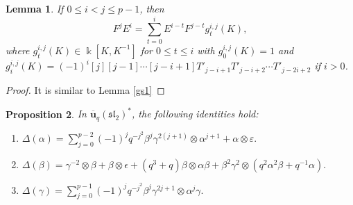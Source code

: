 \documentclass[10pt,oneside]{amsart}
\newcommand{\uq}{\mathbf{\overline{u}}_q(\mathfrak{sl_2})}
\newtheorem{proposition}{Proposition}[section]
\newtheorem{lemma}[proposition]{Lemma}
\theoremstyle{definition}
\def\<{\leqslant}
\def\a{\alpha}
\def\b{\beta}
\def\g{\gamma}
\def\ot{\otimes}
\begin{document}
\begin{lemma}\label{gs2}
If $0\<i<j\<p-1$, then
$$F^jE^i=\sum_{t=0}^iE^{i-t}F^{j-t}g^{i,j}_t(K),$$ where $g^{i,j}_t(K)\in \Bbbk[K,K^{-1}]$ for $0\<t\<i$ with $g^{i,j}_0(K)=1$ and $g^{i,j}_i(K)=(-1)^i[j][j-1]\cdots[j-i+1]T'_{j-i+1}T'_{j-i+2}\cdots T'_{j-2i+2}$ if $i>0$.
\end{lemma}
\begin{proof}
It is similar to Lemma \ref{gs1}
\end{proof}


\begin{proposition}\label{2.7}\label{2.8}\label{2.9}
In $\uq^*$, the following identities hold:
\begin{enumerate}[label=\textup{(\alph*)}]
\item[(a)]
$\Delta(\a)=\sum_{j=0}^{p-2}(-1)^jq^{-j^2}\b^j\g^{2(j+1)}\ot \a^{j+1}+\a\ot \varepsilon.$
\item[(b)]
$\Delta(\b)=\g^{-2}\ot \b+\b\ot \epsilon+(q^3+q)\b\ot \a\b+\b^2\g^2\ot (q^2\a^2\b+q^{-1}\a).$
\item[(c)]
$\Delta(\g)=\sum_{j=0}^{p-1}(-1)^jq^{-j^2}\b^j\g^{2j+1}\ot \a^{j}\g.$
\end{enumerate}
\end{proposition}
\end{document}

